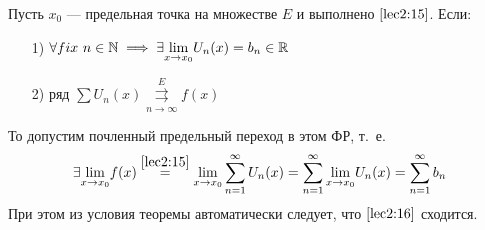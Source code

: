 \documentclass[../../main.tex]{subfiles}
\begin{document}
\begin{thm}
Пусть $x_0$ --- предельная точка на множестве $E$ и выполнено 
$\eqref{lec2:15}$. Если: 
\begin{itemize}
	\item[1)] $\forall fix \ n \in \mathbb{N} \implies
\exists \underset{x \to x_0}{\lim} U_n(x) = b_n \in \mathbb{R}$
	\item[2)] ряд $\sum U_n(x) \overset{E}
	{\underset{n \to \infty}\rightrightarrows} f(x)$
\end{itemize}
То допустим почленный предельный переход в этом ФР, т.~е.
\begin{equation}
\label{lec2:16}
\exists \underset{x \to x_0}{\lim} f(x) \overset{\eqref{lec2:15}}{=}
\underset{x \to x_0}{\lim} \sum\limits_{n = 1}^{\infty} U_n(x) =
\sum\limits_{n = 1}^{\infty} \underset{x \to x_0}{\lim} U_n(x) =
\sum\limits_{n = 1}^{\infty} b_n
\end{equation}	
При этом из условия теоремы автоматически следует, 
что $\eqref{lec2:16}$ сходится.
\end{thm}	
\end{document}
